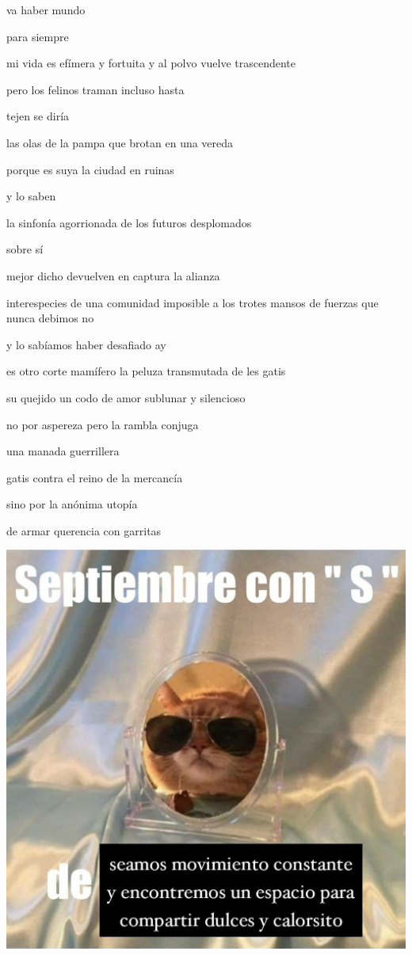 \documentclass[
]{book}
\begin{document}
va haber mundo

para siempre

mi vida es efímera y fortuita y al polvo vuelve trascendente

pero los felinos traman incluso hasta

tejen se diría

las olas de la pampa que brotan en una vereda

porque es suya la ciudad en ruinas

y lo saben

la sinfonía agorrionada de los futuros desplomados

sobre sí

mejor dicho devuelven en captura la alianza

interespecies de una comunidad imposible a los trotes mansos de fuerzas que nunca debimos no

y lo sabíamos haber desafiado ay

es otro corte mamífero la peluza transmutada de les gatis

su quejido un codo de amor sublunar y silencioso

no por aspereza pero la rambla conjuga

una manada guerrillera

gatis contra el reino de la mercancía

sino por la anónima utopía

de armar querencia con garritas

\includegraphics{images/5.png}
\end{document}
